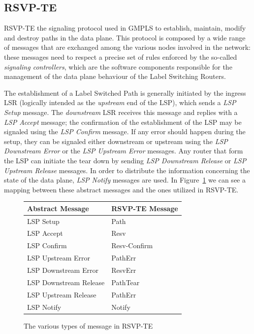 \documentclass[10pt,a4paper]{report}
\begin{document}
\subsection{RSVP-TE}

RSVP-TE the signaling protocol used in GMPLS to establish, maintain,
modify and destroy paths in the data plane. This protocol is composed
by a wide range of messages that are exchanged among the various nodes
involved in the network: these messages need to respect a precise set
of rules enforced by the so-called \textit{signaling controllers},
which are the software components responsible for the management of
the data plane behaviour of the Label Switching Routers.

The establishment of a Label Switched Path is generally initiated by
the ingress LSR (logically intended as the \textit{upstream} end of
the LSP), which sends a \textit{LSP Setup} message. The
\textit{downstream} LSR receives this message and replies with a
\textit{LSP Accept} message; the confirmation of the establishment of
the LSP may be signaled using the \textit{LSP Confirm} message. If any
error should happen during the setup, they can be signaled either
downstream or upstream using the \textit{LSP Downstream Error} or the
\textit{LSP Upstream Error} messages. Any router that form the LSP can
initiate the tear down by sending \textit{LSP Downstream Release} or
\textit{LSP Upstream Release} messages. In order to distribute the
information concerning the state of the data plane, \textit{LSP
  Notify} messages are used. In Figure~\ref{fig:rsvp_messages} we can
see a mapping between these abstract messages and the ones utilized in
RSVP-TE.

\begin{figure}[!htbp]
  \begin{center}
    \begin{tabular}{|l|l|}
      \hline
      Abstract Message &  RSVP-TE Message \\ \hline
      LSP Setup & Path \\
      LSP Accept & Resv \\
      LSP Confirm & Resv-Confirm \\
      LSP Upstream Error & PathErr \\
      LSP Downstream Error & ResvErr \\
      LSP Downstream Release & PathTear \\
      LSP Upstream Release & PathErr \\
      LSP Notify & Notify \\
      \hline
    \end{tabular}
    \caption[RSVP-TE Messages]{The various types of message in
      RSVP-TE}
    \label{fig:rsvp_messages}
  \end{center}
\end{figure}
\end{document}
